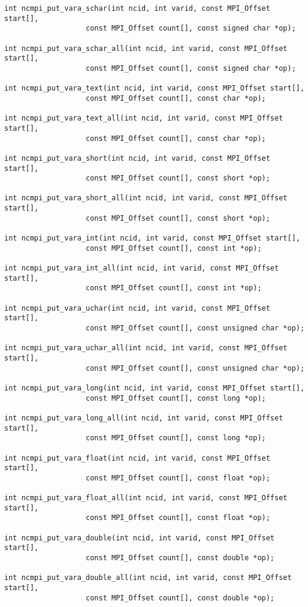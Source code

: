 \begin{verbatim}
int ncmpi_put_vara_schar(int ncid, int varid, const MPI_Offset start[],
                   const MPI_Offset count[], const signed char *op);

int ncmpi_put_vara_schar_all(int ncid, int varid, const MPI_Offset start[],
                   const MPI_Offset count[], const signed char *op);

int ncmpi_put_vara_text(int ncid, int varid, const MPI_Offset start[],
                   const MPI_Offset count[], const char *op);

int ncmpi_put_vara_text_all(int ncid, int varid, const MPI_Offset start[],
                   const MPI_Offset count[], const char *op);

int ncmpi_put_vara_short(int ncid, int varid, const MPI_Offset start[],
                   const MPI_Offset count[], const short *op);

int ncmpi_put_vara_short_all(int ncid, int varid, const MPI_Offset start[],
                   const MPI_Offset count[], const short *op);

int ncmpi_put_vara_int(int ncid, int varid, const MPI_Offset start[],
                   const MPI_Offset count[], const int *op);

int ncmpi_put_vara_int_all(int ncid, int varid, const MPI_Offset start[],
                   const MPI_Offset count[], const int *op);

int ncmpi_put_vara_uchar(int ncid, int varid, const MPI_Offset start[],
                   const MPI_Offset count[], const unsigned char *op);

int ncmpi_put_vara_uchar_all(int ncid, int varid, const MPI_Offset start[],
                   const MPI_Offset count[], const unsigned char *op);

int ncmpi_put_vara_long(int ncid, int varid, const MPI_Offset start[],
                   const MPI_Offset count[], const long *op);

int ncmpi_put_vara_long_all(int ncid, int varid, const MPI_Offset start[],
                   const MPI_Offset count[], const long *op);

int ncmpi_put_vara_float(int ncid, int varid, const MPI_Offset start[],
                   const MPI_Offset count[], const float *op); 

int ncmpi_put_vara_float_all(int ncid, int varid, const MPI_Offset start[],
                   const MPI_Offset count[], const float *op); 

int ncmpi_put_vara_double(int ncid, int varid, const MPI_Offset start[],
                   const MPI_Offset count[], const double *op); 

int ncmpi_put_vara_double_all(int ncid, int varid, const MPI_Offset start[],
                   const MPI_Offset count[], const double *op); 
\end{verbatim}


